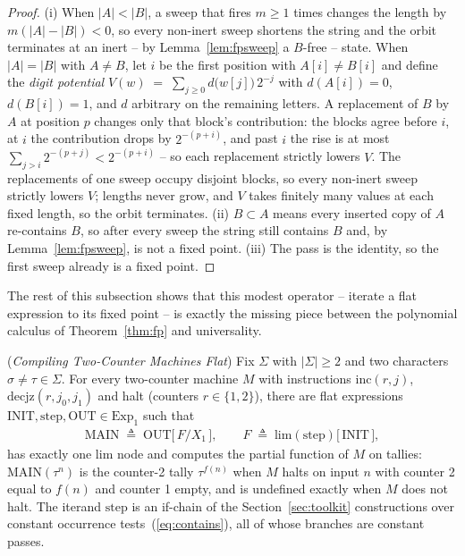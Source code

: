 \documentclass[runningheads,envcountsect]{llncs}
\begin{document}
\begin{proof}
    (i) When $|A| < |B|$, a sweep that fires $m \geq 1$ times changes
    the length by $m(|A| - |B|) < 0$, so every non-inert sweep
    shortens the string and the orbit terminates at an inert -- by
    Lemma~\ref{lem:fpsweep} a $B$-free -- state. When $|A| = |B|$ with
    $A \neq B$, let $i$ be the first position with $A[i] \neq B[i]$ and
    define the \emph{digit potential}
    $V(w) \;=\; \sum_{j \geq 0} d\big(w[j]\big)\,2^{-j}$
    with $d(A[i]) = 0$, $d(B[i]) = 1$, and $d$ arbitrary on the
    remaining letters. A replacement of $B$ by $A$ at position $p$
    changes only that block's contribution: the blocks agree before
    $i$, at $i$ the contribution drops by $2^{-(p+i)}$, and past $i$
    the rise is at most $\sum_{j > i} 2^{-(p+j)} < 2^{-(p+i)}$ -- so
    each replacement strictly lowers $V$. The replacements of one
    sweep occupy disjoint blocks, so every non-inert sweep strictly
    lowers $V$; lengths never grow, and $V$ takes finitely many values
    at each fixed length, so the orbit terminates. (ii) $B \subset A$
    means every inserted copy of $A$ re-contains $B$, so after every
    sweep the string still contains $B$ and, by
    Lemma~\ref{lem:fpsweep}, is not a fixed point. (iii) The pass is
    the identity, so the first sweep already is a fixed point.
\end{proof}

The rest of this subsection shows that this modest operator -- iterate a
flat expression to its fixed point -- is exactly the missing piece
between the polynomial calculus of Theorem~\ref{thm:fp} and universality.

\begin{theorem}
    (\emph{Compiling Two-Counter Machines Flat})
    \label{thm:lim2cm}
    Fix $\Sigma$ with $|\Sigma| \geq 2$ and two characters
    $\sigma \neq \tau \in \Sigma$. For every two-counter machine $M$ with
    instructions $\mathrm{inc}(r, j)$, $\mathrm{decjz}(r, j_0, j_1)$ and
    halt (counters $r \in \{1, 2\}$), there are flat expressions
    $\mathrm{INIT}, \mathrm{step}, \mathrm{OUT} \in \mathrm{Exp}_1$ such
    that
    \begin{align}
        \mathrm{MAIN} \;\triangleq\; \mathrm{OUT}\big[\,F/X_1\,\big],
        \qquad F \;\triangleq\; \mathrm{lim}(\mathrm{step})\big[\,\mathrm{INIT}\,\big],
    \end{align}
    has exactly one $\mathrm{lim}$ node and computes the partial
    function of $M$ on tallies: $\mathrm{MAIN}(\tau^n)$ is the
    counter-2 tally $\tau^{f(n)}$ when $M$ halts on input $n$ with
    counter 2 equal to $f(n)$ and counter 1 empty, and is undefined
    exactly when $M$ does not halt. The iterand $\mathrm{step}$ is an
    if-chain of the Section~\ref{sec:toolkit} constructions over
    constant occurrence tests~(\ref{eq:contains}), all of whose branches
    are constant passes.
\end{theorem}
\end{document}
